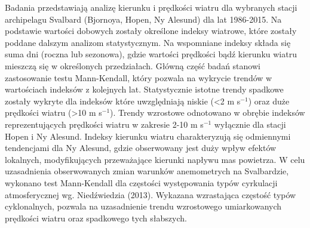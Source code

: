 \documentclass[\main/boa.tex]{subfiles}
\begin{document}
Badania przedstawiają analizę kierunku i prędkości wiatru dla wybranych stacji archipelagu Svalbard (Bjornoya, Hopen, Ny Alesund) dla lat 1986-2015. Na podstawie wartości dobowych zostały określone indeksy wiatrowe, które zostały poddane dalszym analizom statystycznym. Na wspomniane indeksy składa się suma dni (roczna lub sezonowa), gdzie wartości prędkości bądź kierunku wiatru mieszczą się w określonych przedziałach. Główną część badań stanowi zastosowanie testu Mann-Kendall, który pozwala na wykrycie trendów w wartościach indeksów z kolejnych lat. Statystycznie istotne trendy spadkowe zostały wykryte dla indeksów które uwzględniają niskie (<2 m s$^{-1}$) oraz duże prędkości wiatru (>10 m s$^{-1}$). Trendy wzrostowe odnotowano w obrębie indeksów reprezentujących prędkości wiatru w zakresie 2-10 m s$^{-1}$ wyłącznie dla stacji Hopen i Ny Alesund. Indeksy kierunku wiatru charakteryzują się odmiennymi tendencjami dla Ny Alesund, gdzie obserwowany jest duży wpływ efektów lokalnych, modyfikujących przeważające kierunki napływu mas powietrza. W celu uzasadnienia obserwowanych zmian warunków anemometrych na Svalbardzie, wykonano test Mann-Kendall dla częstości występowania typów cyrkulacji atmosferycznej wg. Niedźwiedzia (2013). Wykazana wzrastająca częstość typów cyklonalnych, pozwala na uzasadnienie trendu wzrostowego umiarkowanych prędkości wiatru oraz spadkowego tych słabszych. 
\end{document}

